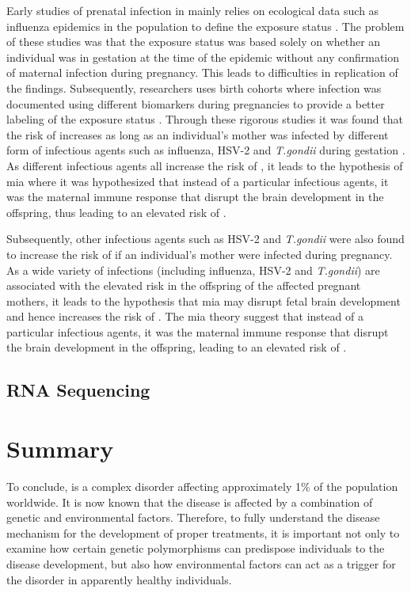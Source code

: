 	Early studies of prenatal infection in  mainly relies on ecological data such as influenza epidemics in the population to define the exposure status \citep{Brown2010}.
	The problem of these studies was that the exposure status was based solely on whether an individual was in gestation at the time of the epidemic without any confirmation of maternal infection during pregnancy.
	This leads to difficulties in replication of the findings.
	Subsequently, researchers uses birth cohorts where infection was documented using different biomarkers during pregnancies to provide a better labeling of the exposure status \citep{Brown2010}.
	Through these rigorous studies it was found that the risk of  increases as long as an individual's mother was infected by different form of infectious agents such as influenza, HSV-2 and \textit{T.gondii} during gestation \citep{Brown2010}.
	As different infectious agents all increase the risk of , it leads to the hypothesis of \gls{mia} \citep{Brown2010} where it was hypothesized that instead of a particular infectious agents, it was the maternal immune response that disrupt the brain development in the offspring, thus leading to an elevated risk of .
	
	Subsequently, other infectious agents such as HSV-2 and \textit{T.gondii} were also found to increase the risk of  if an individual's mother were infected during pregnancy.
	As a wide variety of infections (including influenza, HSV-2 and \textit{T.gondii}) are associated with the elevated  risk in the offspring of the affected pregnant mothers, it leads to the hypothesis that \gls{mia} may disrupt fetal brain development and hence increases the risk of  \citep{Brown2010}.
	The \gls{mia} theory suggest that instead of a particular infectious agents, it was the maternal immune response that disrupt the brain development in the offspring, leading to an elevated risk of .
	
	\subsection{RNA Sequencing}
	\section{Summary}
	To conclude,  is a complex disorder affecting approximately 1\% of the population worldwide. 
	It is now known that the disease is affected by a combination of genetic and environmental factors. 
	Therefore, to fully understand the disease mechanism for the development of proper treatments, it is important not only to examine how certain genetic polymorphisms can predispose individuals to the disease development, but also how environmental factors can act as a trigger for the disorder in apparently healthy individuals.  
	
